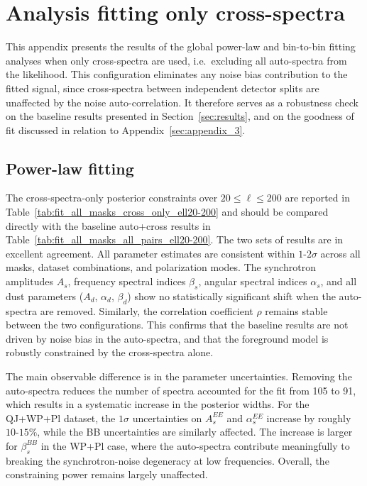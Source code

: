 \section{Analysis fitting only cross-spectra}
\label{sec:appendix_1}

This appendix presents the results of the global power-law and bin-to-bin fitting analyses when only cross-spectra are used, i.e.\ excluding all auto-spectra from the likelihood. This configuration eliminates any noise bias contribution to the fitted signal, since cross-spectra between independent detector splits are unaffected by the noise auto-correlation. It therefore serves as a robustness check on the baseline results presented in Section~\ref{sec:results}, and on the goodness of fit discussed in relation to Appendix~\ref{sec:appendix_3}.

\subsection{Power-law fitting}

The cross-spectra-only posterior constraints over $20 \leq \ell \leq 200$ are reported in Table~\ref{tab:fit_all_masks_cross_only_ell20-200} and should be compared directly with the baseline auto+cross results in Table~\ref{tab:fit_all_masks_all_pairs_ell20-200}. The two sets of results are in excellent agreement. All parameter estimates are consistent within $1$-$2\sigma$ across all masks, dataset combinations, and polarization modes. The synchrotron amplitudes $A_s$, frequency spectral indices $\beta_s$, angular spectral indices $\alpha_s$, and all dust parameters ($A_d$, $\alpha_d$, $\beta_d$) show no statistically significant shift when the auto-spectra are removed. Similarly, the correlation coefficient $\rho$ remains stable between the two configurations. This confirms that the baseline results are not driven by noise bias in the auto-spectra, and that the foreground model is robustly constrained by the cross-spectra alone.

The main observable difference is in the parameter uncertainties. Removing the auto-spectra reduces the number of spectra accounted for the fit from 105 to 91, which results in a systematic increase in the posterior widths. For the QJ+WP+Pl dataset, the $1\sigma$ uncertainties on $A_s^{EE}$ and $\alpha_s^{EE}$ increase by roughly $10$-$15\%$, while the BB uncertainties are similarly affected. The increase is larger for $\beta_s^{BB}$ in the WP+Pl case, where the auto-spectra contribute meaningfully to breaking the synchrotron-noise degeneracy at low frequencies. Overall, the constraining power remains largely unaffected.

